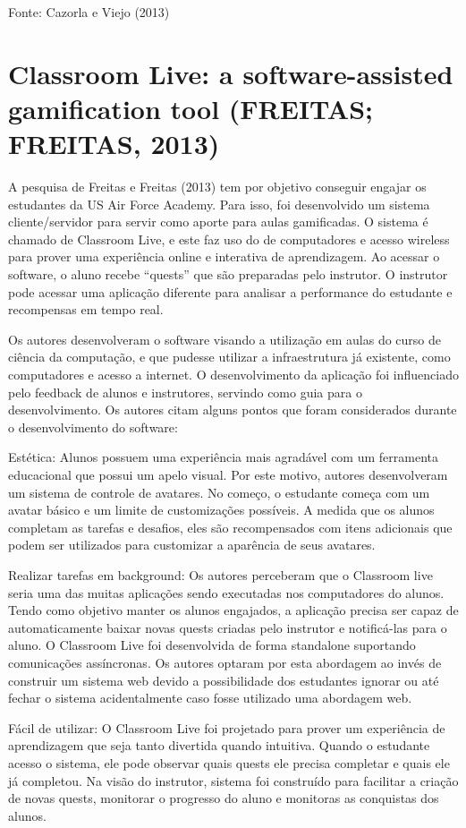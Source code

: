 \documentclass[
	12pt,				%
	oneside,			%
	a4paper,			%
	english,			%
	french,				%
	spanish,			%
	brazil,				%
	]{abntex2}
\begin{document}
Fonte: Cazorla e Viejo  (2013)

\section{Classroom Live: a software-assisted gamification tool (FREITAS; FREITAS, 2013)}

A pesquisa de Freitas e Freitas (2013) tem por objetivo conseguir engajar os estudantes da US Air Force Academy. Para isso, foi desenvolvido um sistema cliente/servidor para servir como aporte para aulas gamificadas. O sistema é chamado de Classroom Live, e este faz uso do de computadores e acesso wireless para prover uma experiência online e interativa de aprendizagem. Ao acessar o software, o aluno recebe “quests” que são preparadas pelo instrutor. O instrutor pode acessar uma aplicação diferente para analisar a performance do estudante e recompensas em tempo real.

Os autores desenvolveram o software visando a utilização em aulas do curso de ciência da computação, e que pudesse utilizar a infraestrutura já existente, como computadores e acesso a internet. O desenvolvimento da aplicação foi influenciado pelo feedback de alunos e instrutores, servindo como guia para o desenvolvimento. Os autores citam alguns pontos que foram considerados durante o desenvolvimento do software:

Estética: Alunos possuem uma experiência mais agradável com um ferramenta educacional que possui um apelo visual. Por este motivo, autores desenvolveram um sistema de controle de avatares. No começo, o estudante começa com um avatar básico e um limite de customizações possíveis. A medida que os alunos completam as tarefas e desafios, eles são recompensados com itens adicionais que podem ser utilizados para customizar a aparência de seus avatares.

Realizar tarefas em background: Os autores perceberam que o Classroom live seria uma das muitas aplicações sendo executadas nos computadores do alunos. Tendo como objetivo manter os alunos engajados, a aplicação precisa ser capaz de automaticamente baixar novas quests criadas pelo instrutor e notificá-las para o aluno. O Classroom Live foi desenvolvida de forma standalone suportando comunicações assíncronas. Os autores optaram por esta abordagem ao invés de construir um sistema web devido a possibilidade dos estudantes ignorar ou até fechar o sistema acidentalmente caso fosse utilizado uma abordagem web.

Fácil de utilizar: O Classroom Live foi projetado para prover um experiência de aprendizagem que seja tanto divertida quando intuitiva. Quando o estudante acesso o sistema, ele pode observar quais quests ele precisa completar e quais ele já completou. Na visão do instrutor, sistema foi construído para facilitar a criação de novas quests, monitorar o progresso do aluno e monitoras as conquistas dos alunos.
\end{document}
